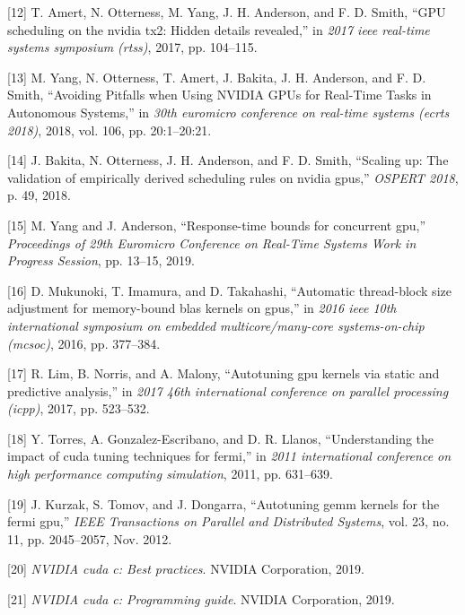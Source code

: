 \documentclass[
  12pt,
  a4paperpaper,
]{report}
\begin{document}
\leavevmode\hypertarget{ref-amert2017gpu}{}%
{[}12{]} T. Amert, N. Otterness, M. Yang, J. H. Anderson, and F. D.
Smith, ``GPU scheduling on the nvidia tx2: Hidden details revealed,'' in
\emph{2017 ieee real-time systems symposium (rtss)}, 2017, pp. 104--115.

\leavevmode\hypertarget{ref-yang2018}{}%
{[}13{]} M. Yang, N. Otterness, T. Amert, J. Bakita, J. H. Anderson, and
F. D. Smith, ``Avoiding Pitfalls when Using NVIDIA GPUs for Real-Time
Tasks in Autonomous Systems,'' in \emph{30th euromicro conference on
real-time systems (ecrts 2018)}, 2018, vol. 106, pp. 20:1--20:21.

\leavevmode\hypertarget{ref-bakita2018scaling}{}%
{[}14{]} J. Bakita, N. Otterness, J. H. Anderson, and F. D. Smith,
``Scaling up: The validation of empirically derived scheduling rules on
nvidia gpus,'' \emph{OSPERT 2018}, p. 49, 2018.

\leavevmode\hypertarget{ref-yang2019}{}%
{[}15{]} M. Yang and J. Anderson, ``Response-time bounds for concurrent
gpu,'' \emph{Proceedings of 29th Euromicro Conference on Real-Time
Systems Work in Progress Session}, pp. 13--15, 2019.

\leavevmode\hypertarget{ref-Mukunoki2016}{}%
{[}16{]} D. Mukunoki, T. Imamura, and D. Takahashi, ``Automatic
thread-block size adjustment for memory-bound blas kernels on gpus,'' in
\emph{2016 ieee 10th international symposium on embedded
multicore/many-core systems-on-chip (mcsoc)}, 2016, pp. 377--384.

\leavevmode\hypertarget{ref-Lim2017}{}%
{[}17{]} R. Lim, B. Norris, and A. Malony, ``Autotuning gpu kernels via
static and predictive analysis,'' in \emph{2017 46th international
conference on parallel processing (icpp)}, 2017, pp. 523--532.

\leavevmode\hypertarget{ref-Torres2011}{}%
{[}18{]} Y. Torres, A. Gonzalez-Escribano, and D. R. Llanos,
``Understanding the impact of cuda tuning techniques for fermi,'' in
\emph{2011 international conference on high performance computing
simulation}, 2011, pp. 631--639.

\leavevmode\hypertarget{ref-Kurzak2012}{}%
{[}19{]} J. Kurzak, S. Tomov, and J. Dongarra, ``Autotuning gemm kernels
for the fermi gpu,'' \emph{IEEE Transactions on Parallel and Distributed
Systems}, vol. 23, no. 11, pp. 2045--2057, Nov. 2012.

\leavevmode\hypertarget{ref-CCUDA20192}{}%
{[}20{]} \emph{NVIDIA cuda c: Best practices}. NVIDIA Corporation, 2019.

\leavevmode\hypertarget{ref-CCUDA2019}{}%
{[}21{]} \emph{NVIDIA cuda c: Programming guide}. NVIDIA Corporation,
2019.
\end{document}
